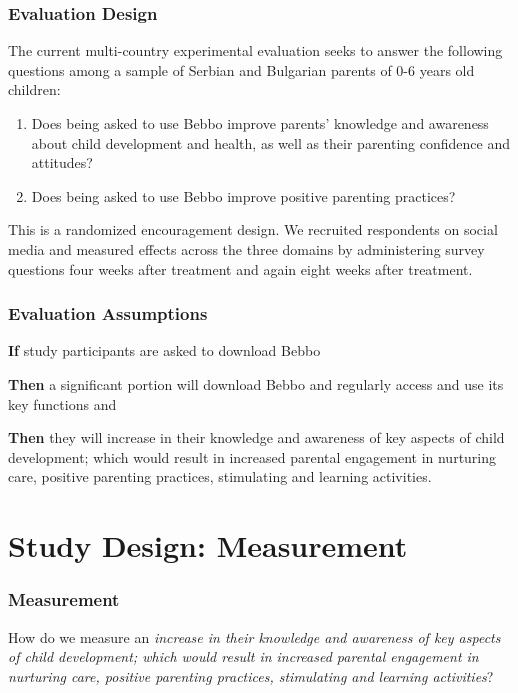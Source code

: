 \documentclass[aspectratio=169]{beamer}
\begin{document}
\begin{frame}
\frametitle{Evaluation Design}

The current multi-country experimental evaluation seeks to answer the following questions among a sample of Serbian and Bulgarian parents of 0-6 years old children:  

\begin{enumerate}
\item Does being asked to use Bebbo improve parents’ knowledge and awareness about child development and health, as well as their parenting confidence and attitudes?
\item Does being asked to use Bebbo improve positive parenting practices?
\end{enumerate}

This is a randomized encouragement design. We recruited respondents on social media and measured effects across the three domains by administering survey questions four weeks after treatment and again eight weeks after treatment. 

\end{frame}


\begin{frame}
  \frametitle{Evaluation Assumptions}

\textbf{If} study participants are asked to download Bebbo

\textbf{Then} a significant portion will download Bebbo and regularly access and use its key functions and 

\textbf{Then} they will increase in their knowledge and awareness of key aspects of child development; which would result in increased parental engagement in nurturing care, positive parenting practices, stimulating and learning activities. 

\end{frame}

\section{Study Design: Measurement}

\begin{frame}
\frametitle{Measurement}
How do we measure an \emph{increase in their knowledge and awareness of key aspects of child development; which would result in increased parental engagement in nurturing care, positive parenting practices, stimulating and learning activities}?

\end{frame}
\end{document}
